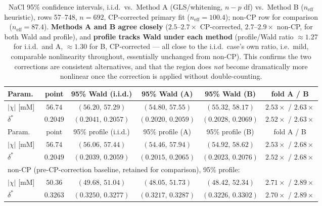 \documentclass[11pt]{article}
\newcommand{\dstar}{\delta^{*}}
\begin{document}
\begin{table}[H]
\centering\small
\begin{tabular}{lccccc}
\toprule
Param.\ & point & 95\% Wald (i.i.d.) & 95\% Wald (A) & 95\% Wald (B) & fold A / B \\
\midrule
$|\chi|$ [\si{mM}] & $56.74$ & $(56.20,\,57.29)$ & $(54.80,\,57.55)$ & $(55.32,\,58.17)$ & $2.53\times$ / $2.63\times$ \\
$\dstar$           & $0.2049$ & $(0.2041,\,0.2057)$ & $(0.2020,\,0.2059)$ & $(0.2028,\,0.2069)$ & $2.52\times$ / $2.63\times$ \\
\midrule
Param.\ & point & 95\% profile (i.i.d.) & 95\% profile (A) & 95\% profile (B) & fold A / B \\
\midrule
$|\chi|$ [\si{mM}] & $56.74$ & $(56.06,\,57.44)$ & $(54.46,\,57.94)$ & $(54.92,\,58.62)$ & $2.53\times$ / $2.68\times$ \\
$\dstar$           & $0.2049$ & $(0.2039,\,0.2059)$ & $(0.2015,\,0.2065)$ & $(0.2023,\,0.2076)$ & $2.52\times$ / $2.68\times$ \\
\midrule
\multicolumn{6}{l}{\footnotesize non-CP (pre-CP-correction baseline, retained for comparison), 95\% profile:} \\
$|\chi|$ [\si{mM}] & $50.36$ & $(49.68,\,51.04)$ & $(48.05,\,51.73)$ & $(48.42,\,52.34)$ & $2.71\times$ / $2.89\times$ \\
$\dstar$           & $0.3263$ & $(0.3250,\,0.3277)$ & $(0.3217,\,0.3287)$ & $(0.3226,\,0.3302)$ & $2.70\times$ / $2.89\times$ \\
\bottomrule
\end{tabular}
\caption{NaCl 95\% confidence intervals, i.i.d.\ vs.\ Method A (GLS/whitening,
$n-p$ df) vs.\ Method B ($n_{\mathrm{eff}}$ heuristic), rows 57--748, $n=692$,
CP-corrected primary fit ($n_{\mathrm{eff}}=100.4$); non-CP row for comparison
($n_{\mathrm{eff}}=87.4$). \textbf{Methods A and B agree closely}
($2.5$--$2.7\times$ CP-corrected, $2.7$--$2.9\times$ non-CP, for both Wald and
profile), and \textbf{profile tracks Wald under each method} (profile/Wald
ratio $\approx1.27$ for i.i.d.\ and A, $\approx1.30$ for B, CP-corrected ---
all close to the i.i.d.\ case's own ratio, i.e.\ mild, comparable nonlinearity
throughout, essentially unchanged from non-CP). This confirms the two
corrections are consistent alternatives, and that the region does \emph{not}
become dramatically more nonlinear once the correction is applied without
double-counting.}
\label{tab:ar1ci}
\end{table}
\end{document}

